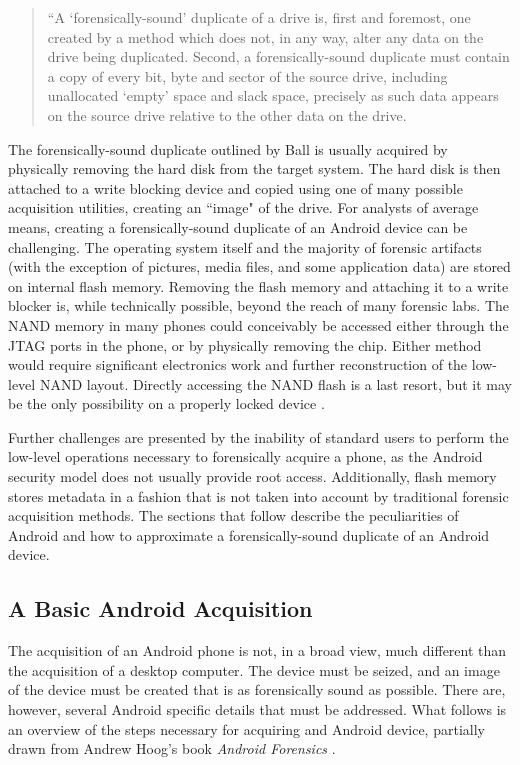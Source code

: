 \begin{quote}
“A ‘forensically-sound’ duplicate of a drive is, first and foremost, one created by a method which does not, in any way, alter any data on the drive being duplicated. 
Second, a forensically-sound duplicate must contain a copy of every bit, byte and sector of the source drive, including unallocated ‘empty’ space and slack space, precisely as such data appears on the source drive relative to the other data on the drive. 

\hspace{\fill}\cite{ball}
\end{quote}

The forensically-sound duplicate outlined by Ball is usually acquired by physically removing the hard disk from the target system.
The hard disk is then attached to a write blocking device and copied using one of many possible acquisition utilities, creating an
``image" of the drive. For analysts of average means, creating a forensically-sound duplicate of an Android device can be
challenging. The operating system itself and the majority of forensic artifacts (with the exception of pictures, media files, and
some application data) are stored on internal flash memory.  Removing the flash memory and attaching it to a write blocker is, while
technically possible, beyond the reach of many forensic labs.  The NAND memory in many phones could conceivably be accessed either
through the JTAG ports in the phone, or by physically removing the chip.  Either method would require significant electronics work
and further reconstruction of the low-level NAND layout. Directly accessing the NAND flash is a last resort, but it may be the only
possibility on a properly locked device \cite{chipoff}.

Further challenges are presented by the inability of standard users to perform the low-level operations necessary to forensically
acquire a phone, as the Android security model does not usually provide root access.  Additionally, flash memory stores metadata in
a fashion that is not taken into account by traditional forensic acquisition methods.  The sections that follow describe the
peculiarities of Android and how to approximate a forensically-sound duplicate of an Android device.

\subsection{A Basic Android Acquisition}

The acquisition of an Android phone is not, in a broad view, much different than the acquisition of a desktop computer. 
The device must be seized, and an image of the device must be created that is as forensically sound as possible.  There are,
however, several Android specific details that must be addressed.  What follows is an overview of the steps necessary for acquiring
and Android device, partially drawn from Andrew Hoog's book \emph{Android Forensics} \cite{hoog}.

